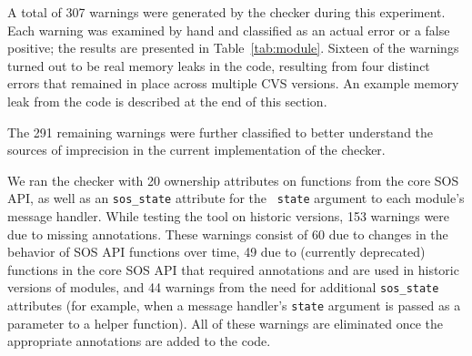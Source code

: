 A total of 307 warnings were generated by the checker during this
experiment.  Each warning was examined by hand and classified as an
actual error or a false positive; the results are presented in
Table~\ref{tab:module}.  Sixteen of the warnings turned out to be real
memory leaks in the code, resulting from four distinct errors that
remained in place across multiple CVS versions.  An example memory
leak from the code is described at the end of this section.

The 291 remaining warnings were further classified to better
understand the sources of imprecision in the current implementation of
the checker.  


\smallskip {}
We ran the checker with 20 ownership attributes on functions from the
core SOS API, as well as an {\tt sos\_state} attribute for the {\tt
state} argument to each module's message handler.
While testing the tool on historic versions, 153 warnings were due to
missing annotations.  These warnings consist of 60 due to changes in
the behavior of SOS API functions over time, 49 due to (currently
deprecated) functions in the core SOS API that required annotations
and are used in historic versions of modules, and 44 warnings from the
need for additional {\tt sos\_state} attributes (for example, when a
message handler's {\tt state} argument is passed as a parameter to a
helper function).
All of these warnings are eliminated once the appropriate annotations
are added to the code.

